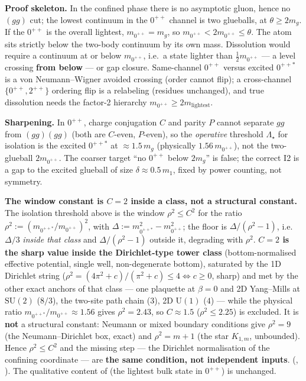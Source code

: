 \textbf{Proof skeleton.} In the confined phase there is no asymptotic gluon, hence no $(gg)$ cut;
the lowest continuum in the $0^{++}$ channel is two glueballs, at $\theta\ge2m_g$. If the
$0^{++}$ is the overall lightest, $m_{0^{++}}=m_g$, so $m_{0^{++}}<2m_{0^{++}}\le\theta$. The atom
sits strictly below the two-body continuum by its own mass. Dissolution would require a continuum
at or below $m_{0^{++}}$, i.e.\ a state lighter than $\tfrac12m_{0^{++}}$ --- a level crossing
\textbf{from below} --- or gap closure. Same-channel $0^{++}$ versus excited $0^{++*}$ is a von
Neumann--Wigner avoided crossing (order cannot flip); a cross-channel $\{0^{++},2^{++}\}$
ordering flip is a relabeling (residues unchanged), and true dissolution needs the factor-2
hierarchy $m_{0^{++}}\ge2m_{\mathrm{lightest}}$.

\textbf{Sharpening.} In $0^{++}$, charge conjugation $C$ and parity $P$ cannot separate $gg$ from
$(gg)(gg)$ (both are $C$-even, $P$-even), so the \emph{operative} threshold $\Lambda_{\star}$ for
isolation is the excited $0^{++*}$ at $\approx1.5\,m_g$ (physically $1.56\,m_{0^{++}}$), not the
two-glueball $2m_{0^{++}}$. The coarser target ``no $0^{++}$ below $2m_g$'' is false; the correct
I2 is a gap to the excited glueball of size $\delta\approx0.5\,m_1$, fixed by power counting, not
symmetry.

\textbf{The window constant is $C=2$ inside a class, not a structural constant.} The isolation
threshold above is the window $\rho^2\le C^2$ for the ratio $\rho^2:=(m_{0^{++*}}/m_{0^{++}})^2$,
with $\Delta:=m_{0^{++*}}^2-m_{0^{++}}^2$; the floor is $\Delta/(\rho^2-1)$, i.e.\ $\Delta/3$
\emph{inside that class} and $\Delta/(\rho^2-1)$ outside it, degrading with $\rho^2$. \textbf{$C=2$ is
the sharp value inside the Dirichlet-type tower class} (bottom-normalised effective potential, single
well, non-degenerate bottom), saturated by the 1D Dirichlet string
($\rho^2=(4\pi^2+c)/(\pi^2+c)\le4\iff c\ge0$, sharp) and met by the other exact anchors of that class
--- one plaquette at $\beta=0$ and 2D Yang--Mills at $\mathrm{SU}(2)$ ($8/3$), the two-site path chain
($3$), 2D $\mathrm{U}(1)$ ($4$) --- while the physical ratio $m_{0^{++*}}/m_{0^{++}}\approx1.56$ gives
$\rho^2=2.43$, so $C\approx1.5$ ($\rho^2\le2.25$) is excluded. It is \textbf{not} a structural
constant: Neumann or mixed boundary conditions give $\rho^2=9$ (the Neumann--Dirichlet box, exact) and
$\rho^2=m+1$ (the star $K_{1,m}$, unbounded). Hence $\rho^2\le C^2$ and the missing step --- the
Dirichlet normalisation of the confining coordinate --- are \textbf{the same condition, not
independent inputs}. \LM{} (,
). The qualitative content of  (the lightest
bulk state in $0^{++}$) is unchanged.

